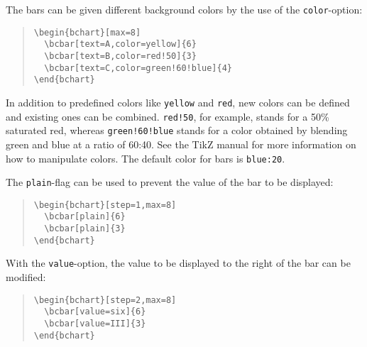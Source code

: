 \documentclass{article}
\begin{document}
The bars can be given different background colors by the use of the \texttt{color}-option:
\begin{quote}\small
\begin{verbatim}
\begin{bchart}[max=8]
  \bcbar[text=A,color=yellow]{6}
  \bcbar[text=B,color=red!50]{3}
  \bcbar[text=C,color=green!60!blue]{4}
\end{bchart}
\end{verbatim}
\end{quote}
\begin{quote}
\begin{bchart}[max=8]
\end{bchart}
\end{quote}
In addition to predefined colors like \texttt{yellow} and \texttt{red}, new colors can be defined and existing ones can be combined. \texttt{red!50}, for example, stands for a 50\% saturated red, whereas \texttt{green!60!blue} stands for a color obtained by blending green and blue at a ratio of 60:40. See the TikZ manual for more information on how to manipulate colors. The default color for bars is \texttt{blue:20}.

The \texttt{plain}-flag can be used to prevent the value of the bar to be displayed:
\begin{quote}\small
\begin{verbatim}
\begin{bchart}[step=1,max=8]
  \bcbar[plain]{6}
  \bcbar[plain]{3}
\end{bchart}
\end{verbatim}
\end{quote}
\begin{quote}
\begin{bchart}[step=1,max=8]
\end{bchart}
\end{quote}

With the \texttt{value}-option, the value to be displayed to the right of the bar can be modified:
\begin{quote}\small
\begin{verbatim}
\begin{bchart}[step=2,max=8]
  \bcbar[value=six]{6}
  \bcbar[value=III]{3}
\end{bchart}
\end{verbatim}
\end{quote}
\begin{quote}
\begin{bchart}[step=2,max=8]
\end{bchart}
\end{quote}
\end{document}

